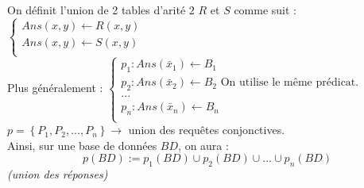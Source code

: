 \documentclass{article}
\begin{document}
On définit l'union de 2 tables d'arité $2$ $R$ et $S$ comme suit : \\
$\left\{ \begin{array}{c}
Ans(x,y) \leftarrow R(x,y)\\
Ans(x,y) \leftarrow S(x,y)\\
\end{array}\right.$ \\
Plus généralement : 
$\left\{ \begin{array}{l}
p_1 : Ans(\bar{x}_1) \leftarrow B_1 \\
p_2 : Ans(\bar{x}_2) \leftarrow B_2 \text{ On utilise le même prédicat.}\\
... \\
p_n : Ans(\bar{x}_n) \leftarrow B_n \\
\end{array}\right.$ \\
$ p = \left\{P_1,P_2,...,P_n\right\} \rightarrow $ union des requêtes conjonctives. \\

\noindent Ainsi, sur une base de données $BD$, on aura :
\[ p(BD)  := p_1(BD) \cup p_2(BD) \cup ... \cup p_n(BD)\] \textit{(union des réponses)}
\end{document}

